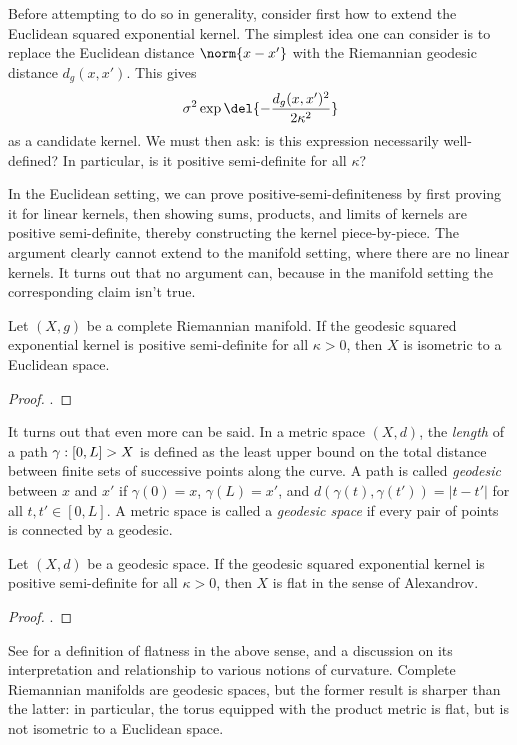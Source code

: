 \documentclass[11pt]{book}
\begin{document}
Before attempting to do so in generality, consider first how to extend the Euclidean squared exponential kernel.
The simplest idea one can consider is to replace the Euclidean distance $\norm{x-x'}$ with the Riemannian geodesic distance $d_g(x,x')$.
This gives 
\[
\sigma^2 \exp\del{-\frac{d_g(x,x')^2}{2\kappa^2}}
\]
as a candidate kernel.
We must then ask: is this expression necessarily well-defined? 
In particular, is it positive semi-definite for all $\kappa$?

In the Euclidean setting, we can prove positive-semi-definiteness by first proving it for linear kernels, then showing sums, products, and limits of kernels are positive semi-definite, thereby constructing the kernel piece-by-piece.
The argument clearly cannot extend to the manifold setting, where there are no linear kernels.
It turns out that no argument can, because in the manifold setting the corresponding claim isn't true.

\begin{result}
Let $(X,g)$ be a complete Riemannian manifold.
If the geodesic squared exponential kernel is positive semi-definite for all $\kappa > 0$, then $X$ is isometric to a Euclidean space.
\end{result}

\begin{proof}
\textcite[Theorem 2]{feragen15}.
\end{proof}

It turns out that even more can be said.
In a metric space $(X,d)$, the \emph{length} of a path  $\gamma : [0,L] \-> X$ is defined as the least upper bound on the total distance between finite sets of successive points along the curve.
A path is called \emph{geodesic} between $x$ and $x'$ if $\gamma(0) = x$, $\gamma(L) = x'$, and $d(\gamma(t),\gamma(t')) = |t - t'|$ for all $t,t'\in[0,L]$.
A metric space is called a \emph{geodesic space} if every pair of points is connected by a geodesic.

\begin{result}
Let $(X,d)$ be a geodesic space.
If the geodesic squared exponential kernel is positive semi-definite for all $\kappa > 0$, then $X$ is flat in the sense of Alexandrov.
\end{result}

\begin{proof}
\textcite[Theorem 2]{feragen15}.
\end{proof}

See \textcite[Chapter 26]{villani08} for a definition of flatness in the above sense, and a discussion on its interpretation and relationship to various notions of curvature.
Complete Riemannian manifolds are geodesic spaces, but the former result is sharper than the latter: in particular, the torus equipped with the product metric is flat, but is not isometric to a Euclidean space.
\end{document}
